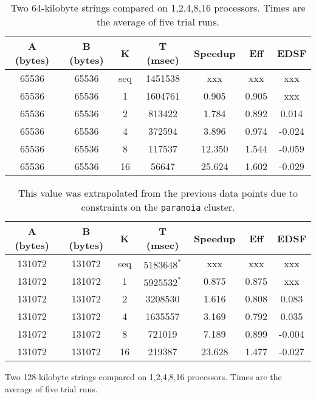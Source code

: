 \begin{table}[h]
	\begin{center}
		\begin{tabular}{ | c | c | c | c | c | c | c |}
			\hline 
			A (bytes)&	B (bytes) &	K	&	T (msec)	&	Speedup	&	Eff		&	EDSF \\
			\hline		
			65536   &	65536   &	seq	&	1451538		&	xxx		&	xxx		&	xxx \\
			65536  	&	65536  	&	1	&	1604761 	&	0.905 	&	0.905	&	xxx \\
			65536  	&	65536  	&	2	&	813422 	 	&	1.784 	&	0.892	&	0.014\\
			65536  	&	65536  	&	4	&	372594 	 	&	3.896 	&	0.974	&	-0.024\\
			65536  	&	65536  	&	8	&	117537 	 	&	12.350	&	1.544	&	-0.059\\
			65536  	&	65536  	&	16	&	56647  	 	&	25.624	&	1.602	&	-0.029\\
			\hline
		\end{tabular}
	\end{center}
	\caption{Two 64-kilobyte strings compared on {1,2,4,8,16} processors. Times are the average of five trial runs.}
\end{table}

\begin{table}[h]
	\begin{center}
		\begin{tabular}{ | c | c | c | c | c | c | c |}
			\hline 
			A (bytes)	&	B (bytes)		 &	K		&	T (msec)	&	Speedup	&	Eff	&	EDSF \\
			\hline		
			131072   	&	131072  	 	&	seq		&	$5183648^*$	&	xxx			&	xxx	&	xxx \\
			131072  	&	131072  		&	1		&	$5925532^*$	&	0.875		&	0.875		&	xxx \\
			131072  	&	131072  		&	2		&	3208530	&	1.616		&	0.808		&	0.083\\
			131072  	&	131072  		&	4		&	1635557	&	3.169		&	0.792		&	0.035\\
			131072  	&	131072  		&	8		&	721019	&	7.189		&	0.899		&	-0.004\\
			131072  	&	131072  		&	16		&	219387	&	23.628		&	1.477		&	-0.027\\
			\hline
		\end{tabular}
	\end{center}
	\caption{Two 128-kilobyte strings compared on {1,2,4,8,16} processors. Times are the average of five trial runs.}
	\caption*{\footnotesize * This value was extrapolated from the previous data points due to constraints on the {\tt paranoia} cluster.}
	\label{table:128kb}
\end{table}
